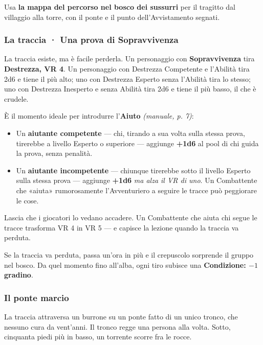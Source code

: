 \documentclass[10pt,a4paper]{article}
\newcommand{\tightlist}{\setlength{\itemsep}{0pt}\setlength{\parskip}{0pt}}
\begin{document}
Usa \textbf{la mappa del percorso nel bosco dei sussurri} per il tragitto dal villaggio alla torre, con il ponte e il punto dell'Avvistamento segnati.

\subsubsection{La traccia · Una prova di Sopravvivenza}\label{la-traccia-una-prova-di-sopravvivenza}

La traccia esiste, ma è facile perderla. Un personaggio con \textbf{Sopravvivenza} tira \textbf{Destrezza, VR 4}. Un personaggio con Destrezza Competente e l'Abilità tira 2d6 e tiene il più alto; uno con Destrezza Esperto senza l'Abilità tira lo stesso; uno con Destrezza Inesperto e senza Abilità tira 2d6 e tiene il più basso, il che è crudele.

È il momento ideale per introdurre l'\textbf{Aiuto} \emph{(manuale, p. 7)}:

\begin{itemize}
\tightlist
\item
  Un \textbf{aiutante competente} --- chi, tirando a sua volta sulla stessa prova, tirerebbe a livello Esperto o superiore --- aggiunge \textbf{+1d6} al pool di chi guida la prova, senza penalità.
\item
  Un \textbf{aiutante incompetente} --- chiunque tirerebbe sotto il livello Esperto sulla stessa prova --- aggiunge \textbf{+1d6} \emph{ma alza il VR di uno}. Un Combattente che «aiuta» rumorosamente l'Avventuriero a seguire le tracce può peggiorare le cose.
\end{itemize}

Lascia che i giocatori lo vedano accadere. Un Combattente che aiuta chi segue le tracce trasforma VR 4 in VR 5 --- e capisce la lezione quando la traccia va perduta.

Se la traccia va perduta, passa un'ora in più e il crepuscolo sorprende il gruppo nel bosco. Da quel momento fino all'alba, ogni tiro subisce una \textbf{Condizione: $-1$ gradino}.

\subsubsection{Il ponte marcio}\label{il-ponte-marcio}

La traccia attraversa un burrone su un ponte fatto di un unico tronco, che nessuno cura da vent'anni. Il tronco regge una persona alla volta. Sotto, cinquanta piedi più in basso, un torrente scorre fra le rocce.
\end{document}

